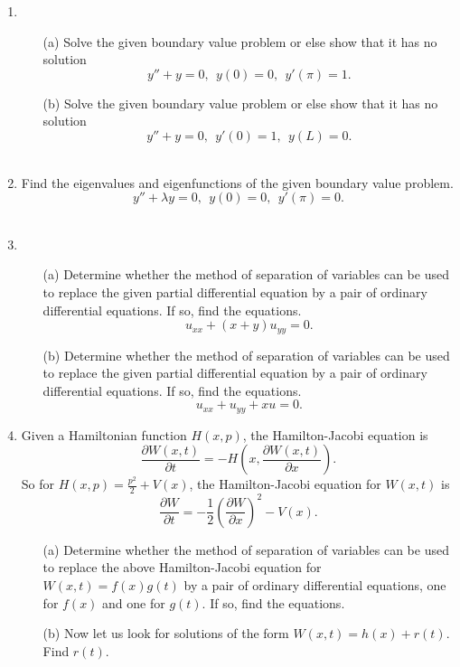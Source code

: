 \documentclass[11pt]{article}
\theoremstyle{definition}
\begin{document}
\begin{enumerate}[leftmargin=*]
\item
\begin{itemize}
\item[(a)] Solve the given boundary value problem or else show that it has no solution
\[ y''+y=0, \ \ y(0)=0, \ \ y'(\pi)=1.\]

\item[(b)] Solve the given boundary value problem or else show that it has no solution
\[ y''+y=0, \ \ y'(0)=1, \ \ y(L)=0.\]\\
\end{itemize}

\item Find the eigenvalues and eigenfunctions of the given boundary value problem.  
\[y''+\lambda y=0, \ \ y(0)=0, \ \ y'(\pi)=0.\]\\



\item 
\begin{itemize}
\item[(a)] Determine whether the method of separation of variables can be used to replace the given partial differential equation by a pair of ordinary differential equations.  If so, find the equations.  
\[u_{xx}+(x+y)u_{yy}=0.\]

\item[(b)] Determine whether the method of separation of variables can be used to replace the given partial differential equation by a pair of ordinary differential equations.  If so, find the equations.  
\[u_{xx}+u_{yy}+xu=0.\]
\end{itemize}

\item Given a Hamiltonian function $H(x, p)$, the Hamilton-Jacobi equation is 
\[
\frac{\partial W(x, t)}{\partial t}=-H\left(x, \frac{\partial W(x, t)}{\partial x}\right). 
\] 
So for $H(x, p) = \frac{p^2}{2}+V(x)$,  the Hamilton-Jacobi equation for  $W(x, t)$ is 
\[
 \frac{\partial W}{\partial t}=-\frac{1}{2}\left(\frac{\partial W}{\partial x}\right)^2-V(x).\]
\begin{itemize}
\item[(a)] Determine whether the method of separation of variables can be used to replace the above Hamilton-Jacobi equation for $W(x,t)=f(x)g(t)$  by a pair of ordinary differential equations, one for $f(x)$ and one for $g(t)$.  
If so, find the equations.

\item[(b)] Now let us look for solutions of the form $W(x,t)=h(x)+r(t)$.  Find $r(t)$. 
\end{itemize}


\end{enumerate}
\end{document}
